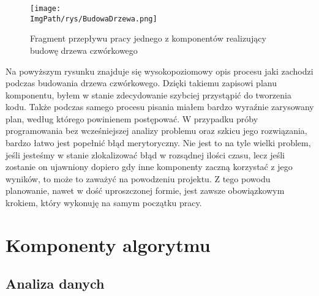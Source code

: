 \documentclass[a4paper,12pt,twoside,openany]{report}
\newcommand{\ImgPath}{.}
\begin{document}
    \begin{figure}[!htbp]
      \begin{center}
    \centering
    \texttt{[image: \\ImgPath/rys/BudowaDrzewa.png]}
    \end{center}
      \caption{Fragment przepływu pracy jednego z komponentów realizujący budowę drzewa czwórkowego}
      \label{budowaDrzewa}
    \end{figure}
    \clearpage

    Na powyższym rysunku znajduje się wysokopoziomowy opis procesu jaki zachodzi podczas budowania drzewa czwórkowego.
    Dzięki takiemu zapisowi planu komponentu, byłem w stanie zdecydowanie szybciej przystąpić do tworzenia kodu.
    Także podczas samego procesu pisania miałem bardzo wyraźnie zarysowany plan, według którego powinienem postępować.
    W przypadku próby programowania bez wcześniejszej analizy problemu oraz szkicu jego rozwiązania, bardzo
    łatwo jest popełnić błąd merytoryczny. Nie jest to na tyle wielki problem, jeśli jesteśmy w stanie zlokalizować
    błąd w rozsądnej ilości czasu, lecz jeśli zostanie on ujawniony dopiero gdy inne komponenty zaczną korzystać 
    z jego wyników, to może to zaważyć na powodzeniu projektu. Z tego powodu planowanie, nawet w dość uproszczonej formie,
    jest zawsze obowiązkowym krokiem, który wykonuję na samym początku pracy.

\chapter{Komponenty algorytmu}

  \section{Analiza danych}
\end{document}
